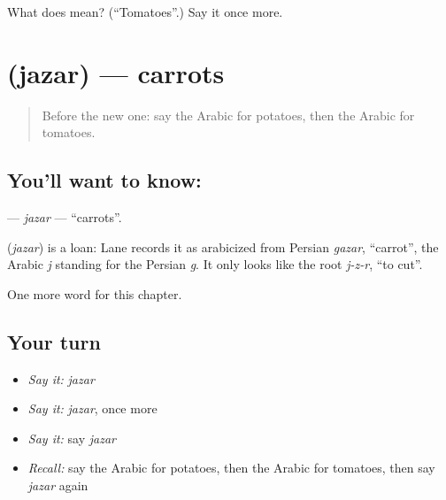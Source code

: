\begin{tcolorbox}[breakable,colback=teal!4,colframe=teal!35!black,title={Before you move on}]
What does  mean? (\textquotedblleft{}Tomatoes\textquotedblright{}.) Say it once more.
\end{tcolorbox}
\section[\texorpdfstring{\ar{جزر} (jazar)}{جزر (jazar)}]{ (jazar) — carrots}

\label{lesson:AR-C67-jazar}



\begin{quote}
Before the new one: say the Arabic for potatoes, then the Arabic for tomatoes.
\end{quote}

\subsection*{You'll want to know: }
\textbf{} — \emph{jazar} — \textquotedblleft{}carrots\textquotedblright{}.

\begin{cousinweb}
\textbf{} (\emph{jazar}) is a loan: Lane records it as arabicized from Persian \emph{gazar}, \textquotedblleft{}carrot\textquotedblright{}, the Arabic \emph{j} standing for the Persian \emph{g}. It only looks like the root \emph{j-z-r}, \textquotedblleft{}to cut\textquotedblright{}.
\end{cousinweb}

\begin{grammarlens}[title={What you've built}]
One more word for this chapter.
\end{grammarlens}

\subsection*{Your turn}
\begin{itemize}
\raggedright
  \item \emph{Say it:} \emph{jazar}
  \item \emph{Say it:} \emph{jazar}, once more
  \item \emph{Say it:} say \emph{jazar}
  \item \emph{Recall:} say the Arabic for potatoes, then the Arabic for tomatoes, then say \emph{jazar} again
\end{itemize}

